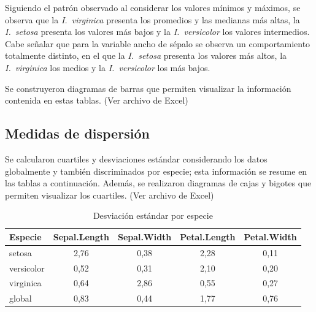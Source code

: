 \documentclass[12pt,a4paper]{article}
\begin{document}
Siguiendo el patrón observado al considerar los valores mínimos y máximos, se observa que la \textit{I.~virginica} presenta los promedios y las medianas más altas, la \textit{I.~setosa} presenta los valores más bajos y la \textit{I.~versicolor} los valores intermedios. Cabe señalar que para la variable ancho de sépalo se observa un comportamiento totalmente distinto, en el que la \textit{I.~setosa} presenta los valores más altos, la \textit{I.~virginica} los medios y la \textit{I.~versicolor} los más bajos.

Se construyeron diagramas de barras que permiten visualizar la información contenida en estas tablas. (Ver archivo de Excel)

\subsection{Medidas de dispersión}

Se calcularon cuartiles y desviaciones estándar considerando los datos globalmente y también discriminados por especie; esta información se resume en las tablas a continuación. Además, se realizaron diagramas de cajas y bigotes que permiten visualizar los cuartiles. (Ver archivo de Excel)

\begin{table}[h!]
\centering
\caption{Desviación estándar por especie}
\label{fig:desviacion}
\begin{tabular}{lcccc}
\toprule
\textbf{Especie} & \textbf{Sepal.Length} & \textbf{Sepal.Width} & \textbf{Petal.Length} & \textbf{Petal.Width} \\
\midrule
setosa     & 2,76 & 0,38 & 2,28 & 0,11 \\
versicolor & 0,52 & 0,31 & 2,10 & 0,20 \\
virginica  & 0,64 & 2,86 & 0,55 & 0,27 \\
global     & 0,83 & 0,44 & 1,77 & 0,76 \\
\bottomrule
\end{tabular}
\end{table}
\end{document}

